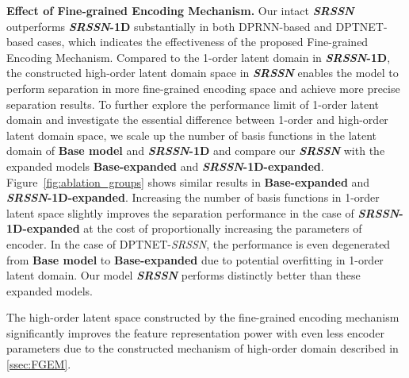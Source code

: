 \smallskip\noindent\textbf{Effect of Fine-grained Encoding Mechanism.}
Our intact \textbf{\emph{SRSSN}} outperforms \textbf{\emph{SRSSN}-1D} substantially in both DPRNN-based and DPTNET-based cases, which indicates the effectiveness of the proposed Fine-grained Encoding Mechanism. Compared to the 1-order latent domain in \textbf{\emph{SRSSN}-1D}, the constructed high-order latent domain space in \textbf{\emph{SRSSN}} enables the model to perform separation in more fine-grained encoding space and achieve more precise separation results. 
To further explore the performance limit of 1-order latent domain and investigate the essential difference between 1-order and high-order latent domain space, we scale up the number of basis functions in the latent domain of \textbf{Base model} and \textbf{\emph{SRSSN}-1D} and compare our \textbf{\emph{SRSSN}} with the expanded models \textbf{Base-expanded} and \textbf{\emph{SRSSN}-1D-expanded}.  Figure~\ref{fig:ablation_groups} shows similar results in \textbf{Base-expanded} and \textbf{\emph{SRSSN}-1D-expanded}. Increasing the number of basis functions in 1-order latent space slightly improves the separation performance in the case of \textbf{\emph{SRSSN}-1D-expanded} at the cost of proportionally increasing the parameters of encoder. In the case of DPTNET-\emph{SRSSN}, the performance is even degenerated from \textbf{Base model} to \textbf{Base-expanded} due to potential overfitting in 1-order latent domain. Our model \textbf{\emph{SRSSN}} performs distinctly better than these expanded models. 

The high-order latent space constructed by the fine-grained encoding mechanism significantly improves the feature representation power with even less encoder parameters due to the constructed mechanism of high-order domain described in \ref{ssec:FGEM}.

